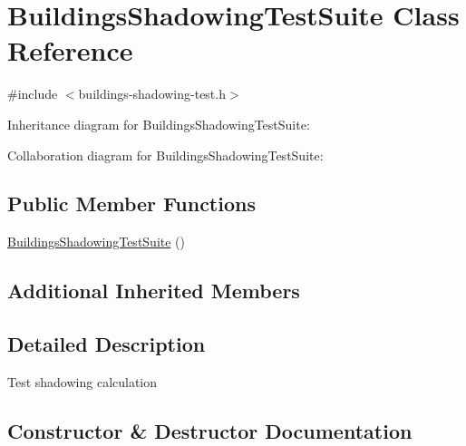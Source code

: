 \hypertarget{classBuildingsShadowingTestSuite}{}\section{Buildings\+Shadowing\+Test\+Suite Class Reference}
\label{classBuildingsShadowingTestSuite}


{\ttfamily \#include $<$buildings-\/shadowing-\/test.\+h$>$}



Inheritance diagram for Buildings\+Shadowing\+Test\+Suite\+:


Collaboration diagram for Buildings\+Shadowing\+Test\+Suite\+:
\subsection*{Public Member Functions}
\begin{DoxyCompactItemize}
\item 
\hyperlink{classBuildingsShadowingTestSuite_a8aff46917cac31ca76e0e60df47d41ad}{Buildings\+Shadowing\+Test\+Suite} ()
\end{DoxyCompactItemize}
\subsection*{Additional Inherited Members}


\subsection{Detailed Description}
Test shadowing calculation 

\subsection{Constructor \& Destructor Documentation}

